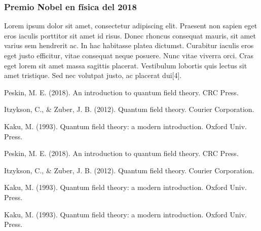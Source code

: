 \documentclass[12pt]{article}
\begin{document}
\subsubsection{Premio Nobel en física del 2018}

Lorem ipsum dolor sit amet, consectetur adipiscing elit. Praesent non sapien eget eros iaculis porttitor sit amet id risus. Donec rhoncus consequat mauris, sit amet varius sem hendrerit ac. In hac habitasse platea dictumst. Curabitur iaculis eros eget justo efficitur, vitae consequat neque posuere. Nunc vitae viverra orci. Cras eget lorem sit amet massa sagittis placerat. Vestibulum lobortis quis lectus sit amet tristique. Sed nec volutpat justo, ac placerat dui[4]. 

\begin{thebibliography}{999}

\bibitem{[1]}
 Peskin, M. E. (2018). An introduction to quantum field theory. CRC Press.
  
\bibitem{[2]}
 Itzykson, C., & Zuber, J. B. (2012). Quantum field theory. Courier Corporation.
  
\bibitem{[3]}
 Kaku, M. (1993). Quantum field theory: a modern introduction. Oxford Univ. Press.
 
 \bibitem{[4]}
 Peskin, M. E. (2018). An introduction to quantum field theory. CRC Press.
  
\bibitem{[5]}
 Itzykson, C., & Zuber, J. B. (2012). Quantum field theory. Courier Corporation.
  
\bibitem{[6]}
 Kaku, M. (1993). Quantum field theory: a modern introduction. Oxford Univ. Press.
 
 \bibitem{[7]}
 Kaku, M. (1993). Quantum field theory: a modern introduction. Oxford Univ. Press.
 

\end{thebibliography}
\end{document}
